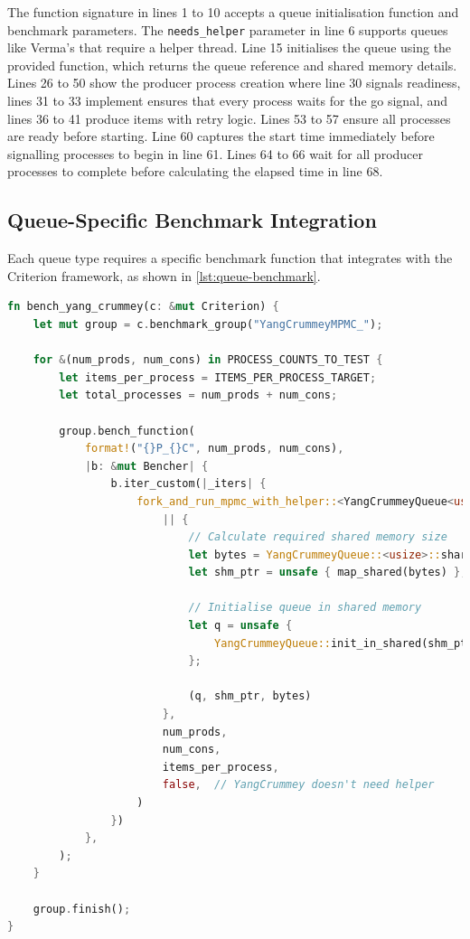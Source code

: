 The function signature in lines 1 to 10 accepts a queue initialisation function and benchmark parameters. The \texttt{needs\_helper} parameter in line 6 supports queues like Verma's that require a helper thread. Line 15 initialises the queue using the provided function, which returns the queue reference and shared memory details. Lines 26 to 50 show the producer process creation where line 30 signals readiness, lines 31 to 33 implement ensures that every process waits for the go signal, and lines 36 to 41 produce items with retry logic. Lines 53 to 57 ensure all processes are ready before starting. Line 60 captures the start time immediately before signalling processes to begin in line 61. Lines 64 to 66 wait for all producer processes to complete before calculating the elapsed time in line 68.

\subsection{Queue-Specific Benchmark Integration}

Each queue type requires a specific benchmark function that integrates with the Criterion framework, as shown in \cref{lst:queue-benchmark}.

\begin{lstlisting}[language=Rust, style=boxed, caption={Queue-specific benchmark function}, label={lst:queue-benchmark}]
fn bench_yang_crummey(c: &mut Criterion) {
    let mut group = c.benchmark_group("YangCrummeyMPMC_");

    for &(num_prods, num_cons) in PROCESS_COUNTS_TO_TEST {
        let items_per_process = ITEMS_PER_PROCESS_TARGET;
        let total_processes = num_prods + num_cons;

        group.bench_function(
            format!("{}P_{}C", num_prods, num_cons),
            |b: &mut Bencher| {
                b.iter_custom(|_iters| {
                    fork_and_run_mpmc_with_helper::<YangCrummeyQueue<usize>, _>(
                        || {
                            // Calculate required shared memory size
                            let bytes = YangCrummeyQueue::<usize>::shared_size(total_processes);
                            let shm_ptr = unsafe { map_shared(bytes) };
                            
                            // Initialise queue in shared memory
                            let q = unsafe {
                                YangCrummeyQueue::init_in_shared(shm_ptr, total_processes)
                            };
                            
                            (q, shm_ptr, bytes)
                        },
                        num_prods,
                        num_cons,
                        items_per_process,
                        false,  // YangCrummey doesn't need helper
                    )
                })
            },
        );
    }

    group.finish();
}
\end{lstlisting}

